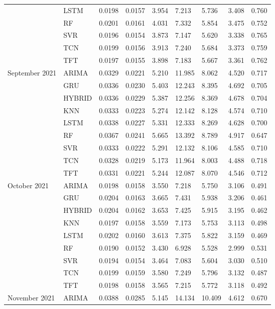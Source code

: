 \begin{tabular}{lllllllll}
 & LSTM & 0.0198 & 0.0157 & 3.954 & 7.213 & 5.736 & 3.408 & 0.760 \\
 & RF & 0.0201 & 0.0161 & 4.031 & 7.332 & 5.854 & 3.475 & 0.752 \\
 & SVR & 0.0196 & 0.0154 & 3.873 & 7.147 & 5.620 & 3.338 & 0.765 \\
 & TCN & 0.0199 & 0.0156 & 3.913 & 7.240 & 5.684 & 3.373 & 0.759 \\
 & TFT & 0.0197 & 0.0155 & 3.898 & 7.183 & 5.667 & 3.361 & 0.762 \\
September 2021 & ARIMA & 0.0329 & 0.0221 & 5.210 & 11.985 & 8.062 & 4.520 & 0.717 \\
 & GRU & 0.0336 & 0.0230 & 5.403 & 12.243 & 8.395 & 4.692 & 0.705 \\
 & HYBRID & 0.0336 & 0.0229 & 5.387 & 12.256 & 8.369 & 4.678 & 0.704 \\
 & KNN & 0.0333 & 0.0223 & 5.274 & 12.142 & 8.128 & 4.574 & 0.710 \\
 & LSTM & 0.0338 & 0.0227 & 5.331 & 12.333 & 8.269 & 4.628 & 0.700 \\
 & RF & 0.0367 & 0.0241 & 5.665 & 13.392 & 8.789 & 4.917 & 0.647 \\
 & SVR & 0.0333 & 0.0222 & 5.291 & 12.132 & 8.106 & 4.585 & 0.710 \\
 & TCN & 0.0328 & 0.0219 & 5.173 & 11.964 & 8.003 & 4.488 & 0.718 \\
 & TFT & 0.0331 & 0.0221 & 5.244 & 12.087 & 8.070 & 4.546 & 0.712 \\
October 2021 & ARIMA & 0.0198 & 0.0158 & 3.550 & 7.218 & 5.750 & 3.106 & 0.491 \\
 & GRU & 0.0204 & 0.0163 & 3.665 & 7.431 & 5.938 & 3.206 & 0.461 \\
 & HYBRID & 0.0204 & 0.0162 & 3.653 & 7.425 & 5.915 & 3.195 & 0.462 \\
 & KNN & 0.0197 & 0.0158 & 3.559 & 7.173 & 5.753 & 3.113 & 0.498 \\
 & LSTM & 0.0202 & 0.0160 & 3.613 & 7.375 & 5.822 & 3.159 & 0.469 \\
 & RF & 0.0190 & 0.0152 & 3.430 & 6.928 & 5.528 & 2.999 & 0.531 \\
 & SVR & 0.0194 & 0.0154 & 3.464 & 7.083 & 5.604 & 3.030 & 0.510 \\
 & TCN & 0.0199 & 0.0159 & 3.580 & 7.249 & 5.796 & 3.132 & 0.487 \\
 & TFT & 0.0198 & 0.0158 & 3.565 & 7.215 & 5.772 & 3.118 & 0.492 \\
November 2021 & ARIMA & 0.0388 & 0.0285 & 5.145 & 14.134 & 10.409 & 4.612 & 0.670 \\

\end{tabular}
